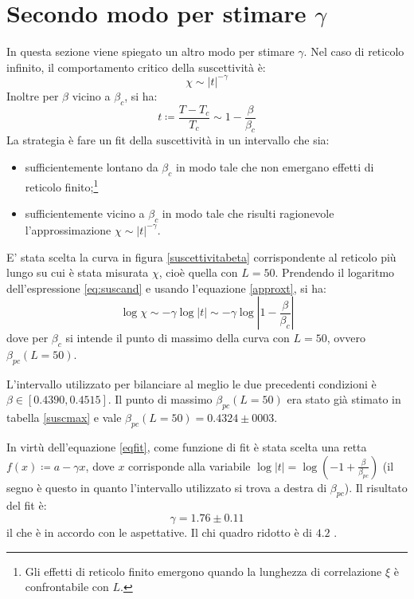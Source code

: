 \documentclass[10pt,a4paper]{article}
\begin{document}
\section{Secondo modo per stimare $\gamma$}
In questa sezione viene spiegato un altro modo per stimare $\gamma$. 
Nel caso di reticolo infinito, il comportamento critico della suscettività è:
\begin{equation}
	\chi \sim |t|^{-\gamma}
	\label{eq:suscand}
\end{equation}
Inoltre per $\beta$ vicino a $\beta_c$, si ha:
\begin{equation}\label{approxt} t\coloneqq\frac{T-T_c}{T_c}\sim1-\frac{\beta}{\beta_c}
\end{equation}
La strategia è fare un fit della suscettività in un intervallo che sia:
\begin{itemize}
	\item sufficientemente lontano da $\beta_c$ in modo tale che non emergano effetti di reticolo finito;\footnote{Gli effetti di reticolo finito emergono quando la lunghezza di correlazione $\xi$ è confrontabile con $L$.}
	\item sufficientemente vicino a $\beta_c$ in modo tale che risulti ragionevole l'approssimazione $\chi\sim |t|^{-\gamma}$.
\end{itemize}  
E' stata scelta la curva in figura \ref{suscettivitabeta} corrispondente al reticolo più lungo su cui è stata misurata $\chi$, cioè quella con $L=50$. Prendendo il logaritmo dell'espressione \ref{eq:suscand} e usando l'equazione \ref{approxt}, si ha:
\begin{equation}\label{eqfit}
\log\chi \sim -\gamma \log|t| \sim -\gamma \log|1-\frac{\beta}{\beta_c}|
\end{equation}
dove per $\beta_c$ si intende il punto di massimo della curva con $L=50$, ovvero $\beta_{pc}(L=50)$.


L'intervallo utilizzato per bilanciare al meglio le due precedenti condizioni è $\beta\in[0.4390,0.4515]$. Il punto di massimo $\beta_{pc}(L=50)$ era stato già stimato in tabella \ref{suscmax} e vale $\beta_{pc}(L=50)=0.4324\pm0003$.

In virtù dell'equazione \ref{eqfit}, come funzione di fit è stata scelta una retta $f(x)\coloneqq a-\gamma x$, dove $x$ corrisponde alla variabile $\log|t|=\log(-1+\frac{\beta}{\beta_{pc}})$ (il segno è questo in quanto l'intervallo utilizzato si trova a destra di $\beta_{pc}$). Il risultato del fit è:%
 $$\gamma=1.76\pm0.11$$ il che è in accordo con le aspettative. Il chi quadro ridotto è di $4.2$ .
\end{document}
